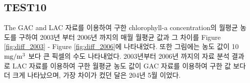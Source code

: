 \subsection{TEST10}
 
The GAC and LAC 자료를 이용하여 구한 chlorophyll-a concentration의 월평균 농도를 구하여 2003년 부터 2006년 까지의 매월 월평균 값과 그 차이를 Figure \ref{fig:diff_2003} - Figure \ref{fig:diff_2006}에 나타내었다. 또한 그림에는 농도 값이 10  ${\rm mg/m^3}$ 보다 큰 픽셀의 수도 나타내었다. 2003년부터 2006년 까지의 자료 분석 결과로 LAC 자료를 이용하여 구한 월평균 농도 값이 GAC 자료를 이용하여 구한 값 보다 더 크게 나타났으며, 가장 차이가 컸던 달은 204년 5월 이었다.
 



